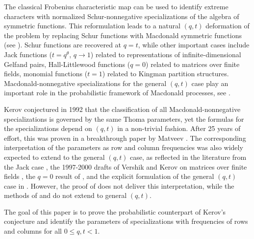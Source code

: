 \documentclass[11pt,reqno]{amsart}
\theoremstyle{definition}
\theoremstyle{remark}
\numberwithin{equation}{section}
\begin{document}
The classical Frobenius characteristic map can be used to identify extreme characters with
normalized Schur-nonnegative specializations of the algebra of symmetric functions. This reformulation leads to a natural $(q,t)$ deformation of the problem by replacing Schur functions with Macdonald symmetric functions (see \cite{Mac95}). Schur functions are recovered at $q=t$, while other important cases include Jack functions ($t=q^{\theta}$, $q\to 1$) related to representations of infinite-dimensional Gelfand pairs, Hall-Littlewood functions ($q=0$) related to matrices over finite fields, monomial functions ($t=1$) related to Kingman partition structures. Macdonald-nonnegative
specializations for the general $(q,t)$ case play an important role in the probabilistic framework of Macdonald processes, see \cite{BC14,BCGS16}.

Kerov conjectured in 1992 \cite[Section~7.3]{Ker92} that the classification of all Macdonald-nonnegative specializations is governed by the same Thoma parameters, yet the formulas for the specializations depend on $(q,t)$ in a non-trivial fashion. After 25 years of effort, this was proven in a breakthrough paper by Matveev \cite{Mat19}. The corresponding interpretation of the parameters as row and column frequencies was also widely expected to extend to the general $(q,t)$ case, as reflected in the literature from the Jack case \cite{KOO98}, the 1997-2000 drafts of Vershik and Kerov on matrices over finite fields \cite{VK07}, the $q=0$ result of \cite{BP15}, and the explicit formulation of the general $(q,t)$ case in \cite[Conjecture~1.9]{BP15}. However, the proof of \cite{Mat19} does not deliver this interpretation, while the methods of \cite{KOO98} and \cite{BP15} do not extend to general $(q,t)$.

The goal of this paper is to prove the probabilistic counterpart of Kerov's conjecture and identify the parameters of specializations with frequencies of rows and columns for all $0\le q,t<1$.
\end{document}
